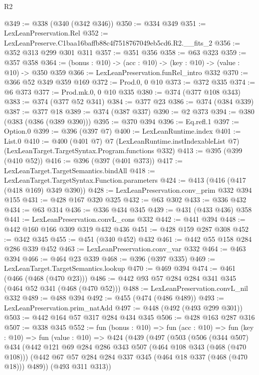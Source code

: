 \begin{lexlean}{R2}
\begin{coremodule}
@349 := @338 (@340 (@342 @346))
@350 := @334 @349
@351 := LexLeanPreservation.Rel
@352 := LexLeanPreserve.C1baa16baffb88c4f7518767049eb5cd6.R2.__fits_2
@356 := @352 @313 @299 @301 @311
@357 := @351 @356
@358 := @63 @323
@359 := @357 @358
@364 := (bonus : @10) -> (acc : @10) -> (key : @10) -> (value : @10) -> @350 @359
@366 := LexLeanPreservation.funRel_intro @332
@370 := @366 @52 @349 @359 @169
@372 := Prod.{0, 0} @10
@373 := @372 @335
@374 := @6 @373
@377 := Prod.mk.{0, 0} @10 @335
@380 := @374 (@377 @108 @343)
@383 := @374 (@377 @52 @341)
@384 := @377 @23
@386 := @374 (@384 @339)
@387 := @377 @18
@389 := @374 (@387 @337)
@390 := @2 @373
@394 := @380 (@383 (@386 (@389 @390)))
@395 := @370 @394
@396 := Eq.refl.{1}
@397 := Option.{0}
@399 := @396 (@397 @7)
@400 := LexLeanRuntime.index
@401 := List.{0}
@410 := @400
    (@401 @7)
    @7
    (LexLeanRuntime.instIndexableList @7)
    (LexLeanTarget.TargetSyntax.Program.functions @332)
@413 := @395 (@399 (@410 @52))
@416 := @396 (@397 (@401 @373))
@417 := LexLeanTarget.TargetSemantics.bindAll
@418 := LexLeanTarget.TargetSyntax.Function.parameters
@424 := @413 (@416 (@417 (@418 @169) @349 @390))
@428 := LexLeanPreservation.conv_prim @332 @394 @155
@431 := @428 @167 @320 @325
@432 := @63 @302
@433 := @336 @432
@434 := @63 @314
@436 := @336 @434 @345
@439 := @431 (@433 @436) @358
@441 := LexLeanPreservation.convL_cons @332
@442 := @441 @394
@448 := @442 @160 @166 @309 @319 @432 @436
@451 := @428 @159 @287 @308
@452 := @342 @345
@455 := @451 (@340 @452) @432
@461 := @442 @55 @158 @284 @286 @339 @452
@463 := LexLeanPreservation.conv_var @332
@464 := @463 @394
@466 := @464 @23 @339
@468 := @396 (@397 @335)
@469 := LexLeanTarget.TargetSemantics.lookup
@470 := @469 @394
@474 := @461 (@466 (@468 (@470 @23)))
@486 := @442 @93 @57 @284 @284 @341 @345 (@464 @52 @341 (@468 (@470 @52)))
@488 := LexLeanPreservation.convL_nil @332
@489 := @488 @394
@492 := @455 (@474 (@486 @489))
@493 := LexLeanPreservation.prim_natAdd
@497 := @448 (@492 (@493 @299 @301))
@503 := @442 @164 @57 @317 @284 @434 @345
@506 := @428 @163 @287 @316
@507 := @338 @345
@552 := fun (bonus : @10) =>
  fun (acc : @10) =>
  fun (key : @10) =>
  fun (value : @10) =>
  @424
    (@439
      (@497
        (@503
          (@506
            (@344 @507)
            @434
            (@442
              @121
              @69
              @284
              @286
              @343
              @507
              (@464 @108 @343 (@468 (@470 @108)))
              (@442 @67 @57 @284 @284 @337 @345 (@464 @18 @337 (@468 (@470 @18))) @489))
            (@493 @311 @313))

\end{coremodule}
\end{lexlean}
